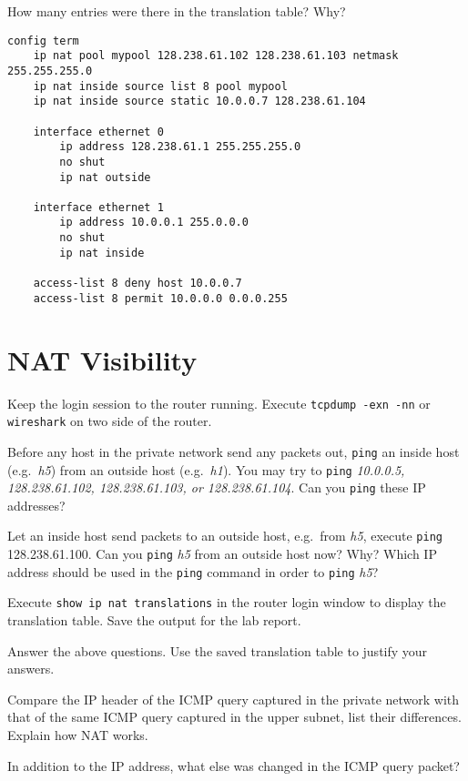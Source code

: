 \documentclass{../UTNetLab}
\begin{document}
    \begin{report}
    \item How many entries were there in the translation table? Why?
    \end{report}
    
    \begin{lstlisting}[language={cisco}, emph={mypool}, caption={NAT Router Configuration in \hyperref[fig:8.7]{Figure~8.7} (Table~8.5)\label{tab:8.5}}]
config term
    ip nat pool mypool 128.238.61.102 128.238.61.103 netmask 255.255.255.0
    ip nat inside source list 8 pool mypool
    ip nat inside source static 10.0.0.7 128.238.61.104

    interface ethernet 0
        ip address 128.238.61.1 255.255.255.0
        no shut
        ip nat outside

    interface ethernet 1
        ip address 10.0.0.1 255.0.0.0
        no shut
        ip nat inside

    access-list 8 deny host 10.0.0.7
    access-list 8 permit 10.0.0.0 0.0.0.255
    \end{lstlisting}

\section{NAT Visibility}
    Keep the login session to the router running.
    Execute \lstinline{tcpdump -exn -nn} or \lstinline{wireshark} on two side of the router.

    Before any host in the private network send any packets out, \lstinline{ping} an inside host (e.g.\ \textit{h5}) from an outside host (e.g.\ \textit{h1}).
    You may try to \lstinline{ping} \textit{10.0.0.5, 128.238.61.102, 128.238.61.103, or 128.238.61.104}.
    Can you \lstinline{ping} these IP addresses? 

    Let an inside host send packets to an outside host, e.g.\ from \textit{h5}, execute \lstinline{ping} 128.238.61.100.
    Can you \lstinline{ping} \textit{h5} from an outside host now? Why? Which IP address should be used in the \lstinline{ping} command in order to \lstinline{ping} \textit{h5}? 

    Execute \lstinline[language=cisco]{show ip nat translations} in the router login window to display the translation table.
    Save the output for the lab report.

    \begin{report}
    \item Answer the above questions.
    Use the saved translation table to justify your answers.
    
    \item Compare the IP header of the ICMP query captured in the private network with that of the same ICMP query captured in the upper subnet, list their differences.
    Explain how NAT works.
    
    \item In addition to the IP address, what else was changed in the ICMP query packet?
    \end{report}
\end{document}
